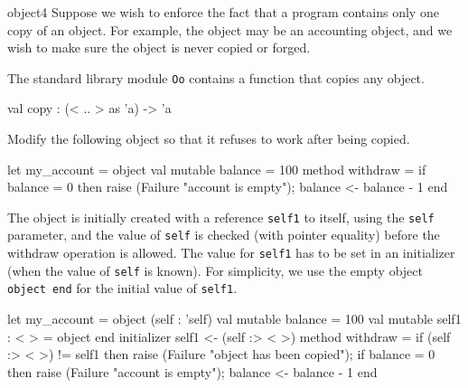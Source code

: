 %
\begin{exercise}{object4}
Suppose we wish to enforce the fact that a program contains only one copy of an object.  For
example, the object may be an accounting object, and we wish to make sure the object is never copied
or forged.

The standard library module \hbox{\lstinline/Oo/} contains a function that copies any object.

\begin{ocaml}
   val copy : (< .. > as 'a) -> 'a
\end{ocaml}
%
Modify the following object so that it refuses to work after being copied.

\begin{ocaml}
let my_account =
object
   val mutable balance = 100
   method withdraw =
      if balance = 0 then
         raise (Failure "account is empty");
      balance <- balance - 1
end
\end{ocaml}

\begin{answer}\ifanswers
  The object is initially created with a reference \lstinline/self1/ to itself, using the \lstinline/self/ parameter,
  and the value of \lstinline/self/ is checked (with pointer equality) before the withdraw operation
  is allowed.  The value for \lstinline/self1/ has to be set in an initializer (when the value of \lstinline/self/ is known).
  For simplicity, we use the empty object \lstinline/object end/ for the initial value of \lstinline/self1/.
\begin{ocaml}
let my_account =
object (self : 'self)
    val mutable balance = 100
    val mutable self1 : < > = object end
    initializer self1 <- (self :> < >)
    method withdraw =
        if (self :> < >) != self1 then
           raise (Failure "object has been copied");
        if balance = 0 then
           raise (Failure "account is empty");
        balance <- balance - 1
end
\end{ocaml}
\fi\end{answer}
\end{exercise}

